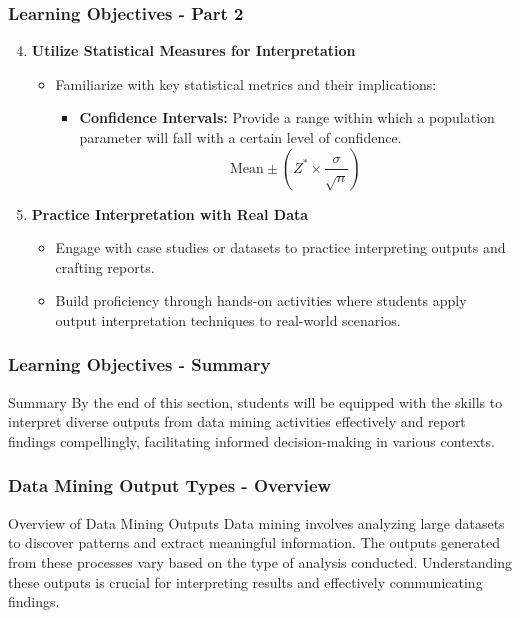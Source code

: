 \documentclass{beamer}
\begin{document}
\begin{frame}[fragile]
    \frametitle{Learning Objectives - Part 2}
    \begin{enumerate}
        \setcounter{enumi}{3}
        \item \textbf{Utilize Statistical Measures for Interpretation}
        \begin{itemize}
            \item Familiarize with key statistical metrics and their implications:
            \begin{itemize}
                \item \textbf{Confidence Intervals:} Provide a range within which a population parameter will fall with a certain level of confidence.
                \begin{equation}
                    \text{Mean} \pm (Z^* \times \frac{\sigma}{\sqrt{n}})
                \end{equation}
            \end{itemize}
        \end{itemize}

        \item \textbf{Practice Interpretation with Real Data}
        \begin{itemize}
            \item Engage with case studies or datasets to practice interpreting outputs and crafting reports.
            \item Build proficiency through hands-on activities where students apply output interpretation techniques to real-world scenarios.
        \end{itemize}
    \end{enumerate}
\end{frame}

\begin{frame}[fragile]
    \frametitle{Learning Objectives - Summary}
    \begin{block}{Summary}
        By the end of this section, students will be equipped with the skills to interpret diverse outputs from data mining activities effectively and report findings compellingly, facilitating informed decision-making in various contexts.
    \end{block}
\end{frame}

\begin{frame}[fragile]
    \frametitle{Data Mining Output Types - Overview}
    \begin{block}{Overview of Data Mining Outputs}
        Data mining involves analyzing large datasets to discover patterns and extract meaningful information. The outputs generated from these processes vary based on the type of analysis conducted. Understanding these outputs is crucial for interpreting results and effectively communicating findings.
    \end{block}
\end{frame}
\end{document}
